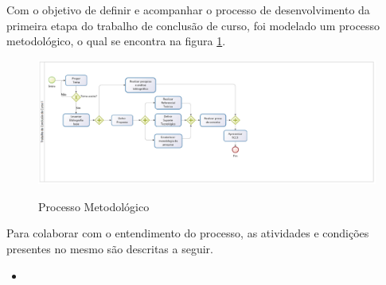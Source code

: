 Com o objetivo de definir e acompanhar o processo de desenvolvimento da primeira etapa do trabalho de conclusão de curso, foi modelado um processo metodológico, o qual se encontra na figura \ref{img:processo}.

\begin{figure}[H]
	\centering
	\caption{Processo Metodológico}
	\includegraphics[scale=0.6]{figuras/processo.eps}
	\label{img:processo}
\end{figure}

Para colaborar com o entendimento do processo, as atividades e condições presentes no mesmo são descritas a seguir.

\begin{itemize}
	\item 
\end{itemize}
